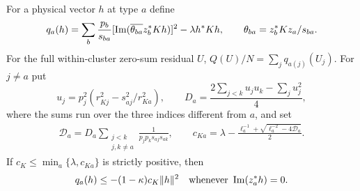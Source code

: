 \begin{lemma}\label{app:local:intrinsic}
For a physical vector $h$ at type $a$ define
\[
 q_a(h)=\sum_b\frac{p_b}{s_{ba}}
       [\operatorname{Im}(\overline{\theta_{ba}}z_b^*Kh)]^2-\lambda h^*Kh,
 \qquad \theta_{ba}=z_b^*Kz_a/s_{ba}.
\]
For the full within-cluster zero-sum residual $U$,
$Q(U)/N=\sum_jq_{a(j)}(U_j)$.
For $j\ne a$ put
\[
 u_j=p_j^2(r_{Kj}^2-s_{aj}^2/r_{Ka}^2),\qquad
 D_a=\frac{2\sum_{j<k}u_ju_k-\sum_ju_j^2}{4},
\]
where the sums run over the three indices different from $a$, and set
\begin{gather}
 \mathcal D_a=D_a\sum_{\substack{j<k\\j,k\ne a}}
                       \frac1{p_jp_ks_{aj}s_{ak}},\qquad
 c_{Ka}=\lambda-\frac{\ell_a^{-1}
                   +\sqrt{\ell_a^{-2}-4\mathcal D_a}}2 .
 \label{app:local:intrinsic-eigen}
\end{gather}
If $c_K\le\min_a\{\lambda,c_{Ka}\}$ is strictly positive, then
\begin{equation}\label{app:local:physical-residual}
 q_a(h)\le-(1-\kappa)c_K\|h\|^2
 \quad\text{whenever }\operatorname{Im}(z_a^*h)=0 .
\end{equation}
\end{lemma}
